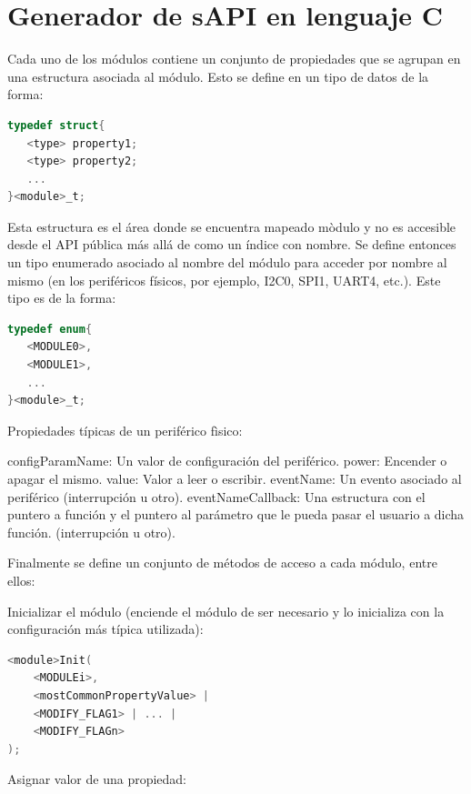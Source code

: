 \section{Generador de sAPI en lenguaje C}
\label{sec:modelGenerator}



Cada uno de los módulos contiene un conjunto de propiedades que se agrupan en una estructura asociada al módulo. Esto se define en un tipo de datos de la forma:

\begin{lstlisting}[language=C]
typedef struct{
   <type> property1;
   <type> property2;
   ...
}<module>_t;
\end{lstlisting}

Esta estructura es el área donde se encuentra mapeado mòdulo y no es accesible desde el API pública más allá de como un índice con nombre. Se define entonces un tipo enumerado asociado al nombre del módulo para acceder por nombre al mismo (en los periféricos físicos, por ejemplo, I2C0, SPI1, UART4, etc.). Este tipo es de la forma:

\begin{lstlisting}[language=C]
typedef enum{
   <MODULE0>,
   <MODULE1>,
   ...
}<module>_t;
\end{lstlisting}

Propiedades típicas de un periférico fìsico:

configParamName: Un valor de configuración del periférico.
power: Encender o apagar el mismo.
value: Valor a leer o escribir.
eventName: Un evento asociado al periférico (interrupción u otro).
eventNameCallback: Una estructura con el puntero a función y el puntero al parámetro que le pueda pasar el usuario a dicha función. (interrupción u otro).

Finalmente se define un conjunto de métodos de acceso a cada módulo, entre ellos:


Inicializar el módulo (enciende el módulo de ser necesario y lo inicializa con la configuración más típica utilizada):

\begin{lstlisting}[language=C]
<module>Init(
    <MODULEi>,
    <mostCommonPropertyValue> | 
    <MODIFY_FLAG1> | ... | 
    <MODIFY_FLAGn>
);
\end{lstlisting}

Asignar valor de una propiedad: 

